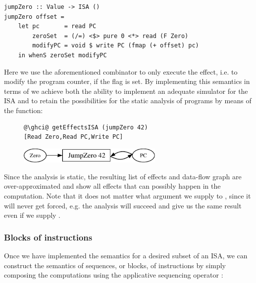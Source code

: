 \begin{verbatim}
jumpZero :: Value -> ISA ()
jumpZero offset =
    let pc       = read PC
        zeroSet  = (/=) <$> pure 0 <*> read (F Zero)
        modifyPC = void $ write PC (fmap (+ offset) pc)
    in whenS zeroSet modifyPC
\end{verbatim}

Here we use the aforementioned  combinator to only execute the effect, i.e.
to modify the program counter, if the flag is set. By implementing this semantics in terms of
 we achieve both the ability to implement an adequate simulator for the ISA and
to retain the possibilities for the static analysis of programs by means of the 
function:

\begin{figure}[!h]
 \begin{minipage}{0.45\textwidth}
\raggedleft
\begin{verbatim}
@\ghci@ getEffectsISA (jumpZero 42)
[Read Zero,Read PC,Write PC]
\end{verbatim}
 \end{minipage}
 \begin{minipage}{0.45\textwidth}
  \centering
  \includegraphics[width=7cm]{./fig/jumpZero.pdf}
 \end{minipage}
\end{figure}

Since the analysis is static, the resulting list of effects and data-flow graph are
over-approximated and show all effects that can possibly happen in the computation.
Note that it does not matter what argument we supply to , since it will
never get forced, e.g. the analysis will succeed and give us the same result even
if we supply .

\subsubsection{\textbf{Blocks of instructions}}

Once we have implemented the semantics for a desired subset of an ISA, we can construct the
semantics of sequences, or blocks, of instructions by simply composing the  computations
using the applicative sequencing operator \hs{*>}:

